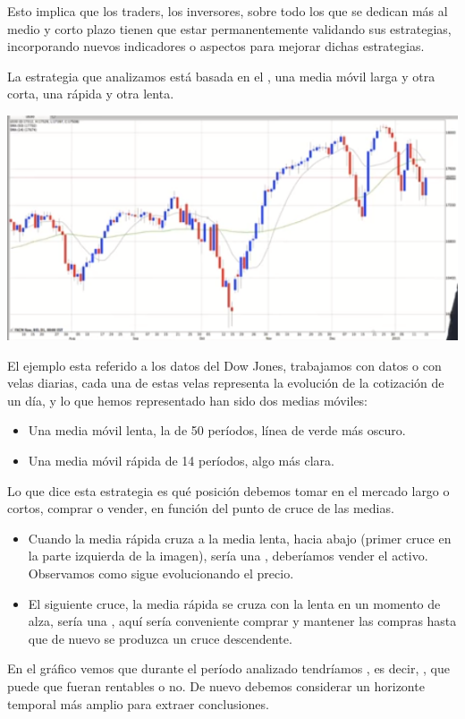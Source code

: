Esto implica que los traders, los inversores,  sobre todo los que se dedican más al medio y corto plazo tienen que estar permanentemente validando sus estrategias, incorporando nuevos indicadores o aspectos para mejorar dichas estrategias.

La estrategia que analizamos está basada en el , una media móvil larga y otra corta, una rápida y otra lenta.
\begin{center}
    \includegraphics[scale=.65]{images/mod03-20.png}
\end{center}
El ejemplo esta referido a los datos del Dow Jones, trabajamos con datos o con velas diarias, cada una de estas velas representa la evolución de la cotización de un día, y lo que hemos representado han sido dos medias móviles:
\begin{itemize}
    \item Una media móvil lenta, la de 50 períodos, línea de verde más oscuro.
    \item Una media móvil rápida de 14 períodos, algo más clara.
\end{itemize}
Lo que dice esta estrategia es qué posición debemos tomar en el mercado largo o cortos, comprar o vender, en función del punto de cruce de las medias.
\begin{itemize}
    \item Cuando la media rápida cruza a la media lenta, hacia abajo (primer cruce en la parte izquierda de la imagen), sería una , deberíamos vender el activo. Observamos como sigue evolucionando el precio.
    \item El siguiente cruce, la media rápida se cruza con la lenta en un momento de alza, sería una , aquí sería conveniente comprar y mantener las compras hasta que de nuevo se produzca un cruce descendente.
\end{itemize}
En el gráfico vemos que durante el período analizado tendríamos , es decir, , que puede que fueran rentables o no. De nuevo debemos considerar un horizonte temporal más amplio para extraer conclusiones.

